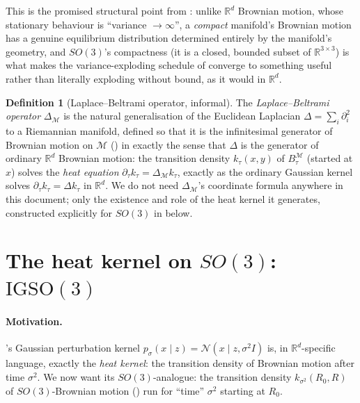 \documentclass[11pt,a4paper]{report}
\theoremstyle{definition}
\newtheorem{definition}[definition]{Definition}
\theoremstyle{remark}
\newcommand{\RR}{\mathbb R}
\begin{document}
This is the promised structural point from :
unlike $\RR^d$ Brownian motion, whose stationary behaviour is
``variance $\to\infty$'', a \emph{compact} manifold's Brownian motion has a
genuine equilibrium distribution determined entirely by the manifold's
geometry, and $SO(3)$'s compactness (it is a closed, bounded subset of
$\RR^{3\times3}$) is what makes the variance-exploding schedule of
 converge to something useful rather than literally
exploding without bound, as it would in $\RR^d$.

\begin{definition}[Laplace--Beltrami operator, informal]
\label{def:laplace-beltrami}
The \emph{Laplace--Beltrami operator} $\Delta_{\mathcal M}$ is the natural
generalisation of the Euclidean Laplacian $\Delta=\sum_i\partial_i^2$ to a
Riemannian manifold, defined so that it is the infinitesimal generator of
Brownian motion on $\mathcal M$ () in exactly
the sense that $\Delta$ is the generator of ordinary $\RR^d$ Brownian
motion: the transition density $k_\tau(x,y)$ of $B^{\mathcal M}_\tau$
(started at $x$) solves the \emph{heat equation}
$\partial_\tau k_\tau = \Delta_{\mathcal M}k_\tau$, exactly as the ordinary
Gaussian kernel solves $\partial_\tau k_\tau=\Delta k_\tau$ in $\RR^d$. We
do not need $\Delta_{\mathcal M}$'s coordinate formula anywhere in this
document; only the existence and role of the heat kernel it generates,
constructed explicitly for $SO(3)$ in  below.
\end{definition}

\section{The heat kernel on $SO(3)$: $\mathrm{IGSO}(3)$}
\label{sec:igso3-derivation}

\paragraph{Motivation.} 's Gaussian perturbation
kernel $p_\sigma(x\mid z)=\mathcal N(x\mid z,\sigma^2I)$ is, in
$\RR^d$-specific language, exactly the \emph{heat kernel}: the transition
density of Brownian motion after time $\sigma^2$. We now want its
$SO(3)$-analogue: the transition density $k_{\sigma^2}(R_0,R)$ of
$SO(3)$-Brownian motion () run for
``time'' $\sigma^2$ starting at $R_0$.
\end{document}

